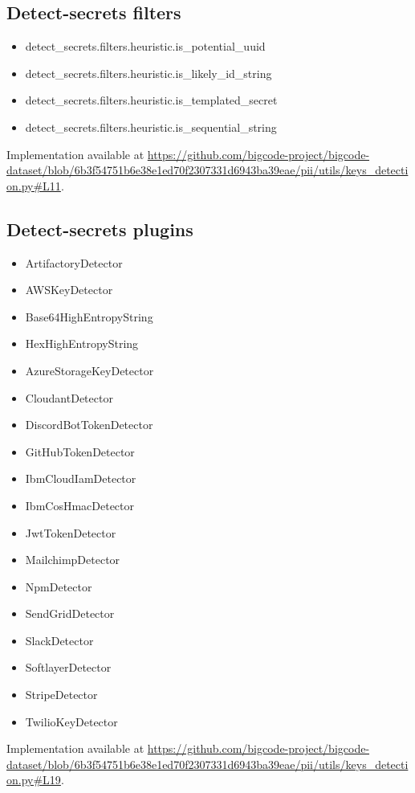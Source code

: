 \documentclass[10pt]{article} \usepackage{iclr2023_conference,times}
\begin{document}
\subsection{Detect-secrets filters}\label{sec:detect-secrets-filters}
\begin{itemize}
\item detect\_secrets.filters.heuristic.is\_potential\_uuid
\item detect\_secrets.filters.heuristic.is\_likely\_id\_string
\item detect\_secrets.filters.heuristic.is\_templated\_secret
\item detect\_secrets.filters.heuristic.is\_sequential\_string
\end{itemize}

Implementation available at \url{https://github.com/bigcode-project/bigcode-dataset/blob/6b3f54751b6e38e1ed70f2307331d6943ba39eae/pii/utils/keys_detection.py#L11}. 

\subsection{Detect-secrets plugins}\label{sec:detect-secrets-plugins}

\begin{itemize}
\item ArtifactoryDetector
\item AWSKeyDetector
\item Base64HighEntropyString
\item HexHighEntropyString
\item AzureStorageKeyDetector
\item CloudantDetector
\item DiscordBotTokenDetector
\item GitHubTokenDetector
\item IbmCloudIamDetector
\item IbmCosHmacDetector
\item JwtTokenDetector
\item MailchimpDetector
\item NpmDetector
\item SendGridDetector
\item SlackDetector
\item SoftlayerDetector
\item StripeDetector
\item TwilioKeyDetector
\end{itemize}
Implementation available at \url{https://github.com/bigcode-project/bigcode-dataset/blob/6b3f54751b6e38e1ed70f2307331d6943ba39eae/pii/utils/keys_detection.py#L19}. 
\end{document}
